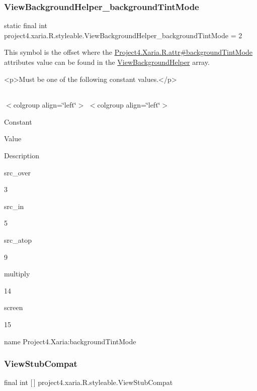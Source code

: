 \subsubsection{\texorpdfstring{View\+Background\+Helper\+\_\+background\+Tint\+Mode}{ViewBackgroundHelper\_backgroundTintMode}}
{\footnotesize\ttfamily static final int project4.\+xaria.\+R.\+styleable.\+View\+Background\+Helper\+\_\+background\+Tint\+Mode = 2\hspace{0.3cm}{\ttfamily [static]}}

This symbol is the offset where the \hyperlink{}{Project4.\+Xaria.\+R.\+attr\#background\+Tint\+Mode} attribute\textquotesingle{}s value can be found in the \hyperlink{classproject4_1_1xaria_1_1R_1_1styleable_aba3e0fe0ba2d99dd8aaedee442947fbe}{View\+Background\+Helper} array.

\begin{DoxyVerb}      <p>Must be one of the following constant values.</p>
\end{DoxyVerb}
 \tabulinesep=1mm
\begin{longtabu} spread 0pt [c]{*{0}{|X[-1]}|}
\hline
\end{longtabu}
$<$colgroup align=\char`\"{}left\char`\"{}$>$ $<$colgroup align=\char`\"{}left\char`\"{}$>$ 

Constant

Value

Description 

{\ttfamily src\+\_\+over}

3

{\ttfamily src\+\_\+in}

5

{\ttfamily src\+\_\+atop}

9

{\ttfamily multiply}

14

{\ttfamily screen}

15

name Project4.\+Xaria\+:background\+Tint\+Mode \mbox{\label{classproject4_1_1xaria_1_1R_1_1styleable_a4fd904903e273c876de7c4d8bcb8bd8e}} 
\subsubsection{\texorpdfstring{View\+Stub\+Compat}{ViewStubCompat}}
{\footnotesize\ttfamily final int \mbox{[}$\,$\mbox{]} project4.\+xaria.\+R.\+styleable.\+View\+Stub\+Compat\hspace{0.3cm}{\ttfamily [static]}}

